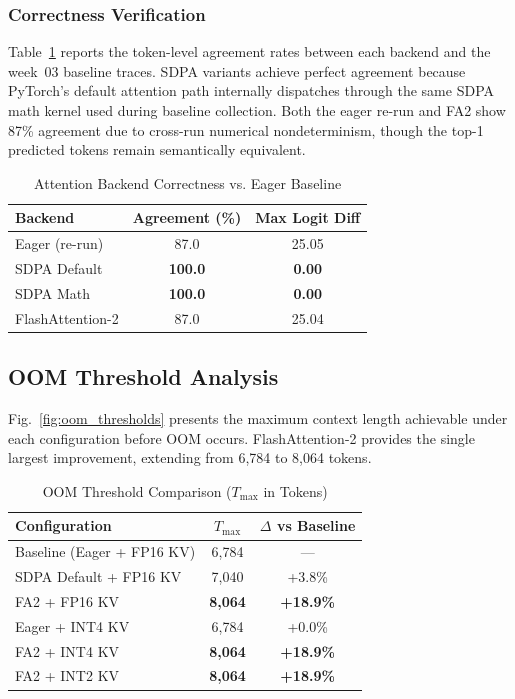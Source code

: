 \documentclass[conference]{IEEEtran}
\begin{document}
\subsubsection{Correctness Verification}
Table~\ref{tab:correctness} reports the token-level agreement rates between each backend and the week~03 baseline traces. SDPA variants achieve perfect agreement because PyTorch's default attention path internally dispatches through the same SDPA math kernel used during baseline collection. Both the eager re-run and FA2 show 87\% agreement due to cross-run numerical nondeterminism, though the top-1 predicted tokens remain semantically equivalent.

\begin{table}[htbp]
\caption{Attention Backend Correctness vs. Eager Baseline}
\begin{center}
\begin{tabular}{lcc}
\toprule
\textbf{Backend} & \textbf{Agreement (\%)} & \textbf{Max Logit Diff} \\
\midrule
Eager (re-run) & 87.0 & 25.05 \\
SDPA Default & \textbf{100.0} & \textbf{0.00} \\
SDPA Math & \textbf{100.0} & \textbf{0.00} \\
FlashAttention-2 & 87.0 & 25.04 \\
\bottomrule
\end{tabular}
\label{tab:correctness}
\end{center}
\end{table}

\subsection{OOM Threshold Analysis}
\label{sec:oom}

Fig.~\ref{fig:oom_thresholds} presents the maximum context length achievable under each configuration before OOM occurs. FlashAttention-2 provides the single largest improvement, extending from 6{,}784 to 8{,}064 tokens.

\begin{table}[htbp]
\caption{OOM Threshold Comparison ($T_{\max}$ in Tokens)}
\begin{center}
\begin{tabular}{lcc}
\toprule
\textbf{Configuration} & \textbf{$T_{\max}$} & \textbf{$\Delta$ vs Baseline} \\
\midrule
Baseline (Eager + FP16 KV) & 6{,}784 & --- \\
SDPA Default + FP16 KV & 7{,}040 & +3.8\% \\
FA2 + FP16 KV & \textbf{8{,}064} & \textbf{+18.9\%} \\
Eager + INT4 KV & 6{,}784 & +0.0\% \\
FA2 + INT4 KV & \textbf{8{,}064} & \textbf{+18.9\%} \\
FA2 + INT2 KV & \textbf{8{,}064} & \textbf{+18.9\%} \\
\bottomrule
\end{tabular}
\label{tab:oom}
\end{center}
\end{table}
\end{document}

